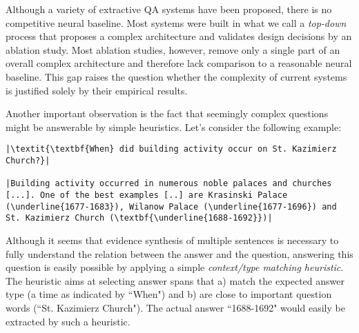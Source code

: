 \documentclass[11pt,a4paper]{article}
\begin{document}
Although a variety of extractive QA systems have been proposed, there is no competitive neural baseline. Most systems were built in what we call a \textit{top-down} process that proposes a complex architecture and validates design decisions by an ablation study. Most ablation studies, however, remove only a single part of an overall complex architecture and therefore lack comparison to a reasonable neural baseline. This gap raises the question whether the complexity of current systems is justified solely by their empirical results. 

Another important observation is the fact that seemingly complex questions might be answerable by simple heuristics. Let's consider the following example:

\begin{mdframed}[roundcorner=2pt]
\begin{lstlisting}[basicstyle=\small\normalfont]
|\textit{\textbf{When} did building activity occur on St. Kazimierz Church?}| 

|Building activity occurred in numerous noble palaces and churches [...]. One of the best examples [..] are Krasinski Palace (\underline{1677-1683}), Wilanow Palace (\underline{1677-1696}) and St. Kazimierz Church (\textbf{\underline{1688-1692}})|
\end{lstlisting}
\end{mdframed}
\noindent
Although it seems that evidence synthesis of multiple sentences is necessary to fully understand the relation between the answer and the question, answering this question is easily possible by applying a simple \textit{context/type matching heuristic}. The heuristic aims at selecting answer spans that a) match the expected answer type (a time as indicated by ``When") and b) are close to important question words (``St. Kazimierz Church"). The actual answer ``1688-1692" would easily be extracted by such a heuristic.
\end{document}
